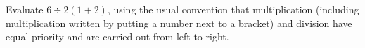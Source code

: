 Evaluate $6\div2(1+2)$, using the usual convention that multiplication (including multiplication written by putting a number next to a bracket) and division have equal priority and are carried out from left to right.
